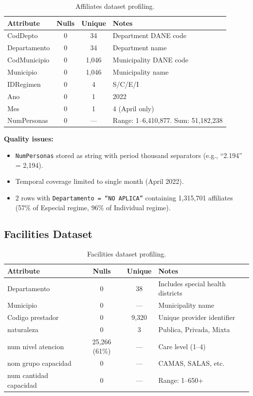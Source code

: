 \documentclass[12pt,a4paper]{article}
\begin{document}
\begin{table}[H]
\centering
\small
\begin{tabularx}{\textwidth}{X c c X}
\toprule
\textbf{Attribute} & \textbf{Nulls} & \textbf{Unique} & \textbf{Notes}\\
\midrule
CodDepto & 0 & 34 & Department DANE code\\
Departamento & 0 & 34 & Department name\\
CodMunicipio & 0 & 1,046 & Municipality DANE code\\
Municipio & 0 & 1,046 & Municipality name\\
IDRegimen & 0 & 4 & S/C/E/I\\
Ano & 0 & 1 & 2022\\
Mes & 0 & 1 & 4 (April only)\\
NumPersonas & 0 & --- & Range: 1--6,410,877. Sum: 51,182,238\\
\bottomrule
\end{tabularx}
\caption{Affiliates dataset profiling.}
\end{table}

\textbf{Quality issues:}
\begin{itemize}[nosep]
    \item \texttt{NumPersonas} stored as string with period thousand separators (e.g., ``2.194'' = 2,194).
    \item Temporal coverage limited to single month (April 2022).
    \item 2 rows with \texttt{Departamento = ``NO APLICA''} containing 1,315,701 affiliates (57\% of Especial regime, 96\% of Individual regime).
\end{itemize}

\subsection{Facilities Dataset}

\begin{table}[H]
\centering
\small
\begin{tabularx}{\textwidth}{X c c X}
\toprule
\textbf{Attribute} & \textbf{Nulls} & \textbf{Unique} & \textbf{Notes}\\
\midrule
Departamento & 0 & 38 & Includes special health districts\\
Municipio & 0 & --- & Municipality name\\
Codigo prestador & 0 & 9,320 & Unique provider identifier\\
naturaleza & 0 & 3 & Publica, Privada, Mixta\\
num nivel atencion & 25,266 (61\%) & --- & Care level (1--4)\\
nom grupo capacidad & 0 & --- & CAMAS, SALAS, etc.\\
num cantidad capacidad & 0 & --- & Range: 1--650+\\
\bottomrule
\end{tabularx}
\caption{Facilities dataset profiling.}
\end{table}
\end{document}
